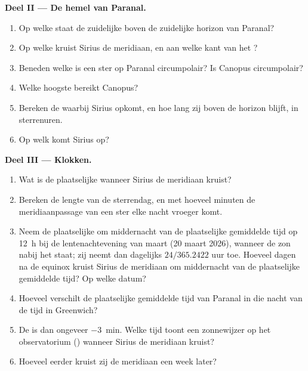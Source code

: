 \begin{problem}
\medskip
\noindent\textbf{Deel II --- De hemel van Paranal.}
\begin{enumerate}[resume]
  \item Op welke  staat de zuidelijke  boven de zuidelijke
        horizon van Paranal?
  \item Op welke  kruist Sirius de meridiaan, en aan welke kant van het
        ?
  \item Beneden welke  is een ster op Paranal circumpolair? Is Canopus
        circumpolair?
  \item Welke hoogste  bereikt Canopus?
  \item Bereken de  waarbij Sirius opkomt, en hoe lang zij boven de
        horizon blijft, in sterrenuren.
  \item Op welk  komt Sirius op?
\end{enumerate}

\medskip
\noindent\textbf{Deel III --- Klokken.}
\begin{enumerate}[resume]
  \item Wat is de plaatselijke  wanneer Sirius de meridiaan kruist?
  \item Bereken de lengte van de sterrendag, en met hoeveel minuten de
        meridiaanpassage van een ster elke nacht vroeger komt.
  \item Neem de plaatselijke  om middernacht van de plaatselijke
        gemiddelde tijd op \qty{12}{h} bij de lentenachtevening van maart
        (20 maart 2026), wanneer de zon nabij het  staat; zij neemt
        dan dagelijks $24/365.2422$ uur toe. Hoeveel dagen na de equinox kruist
        Sirius de meridiaan om middernacht van de plaatselijke gemiddelde tijd?
        Op welke datum?
  \item Hoeveel verschilt de plaatselijke gemiddelde tijd van Paranal in die
        nacht van de tijd in Greenwich?
  \item De  is dan ongeveer \qty{-3}{min}. Welke tijd toont een
        zonnewijzer op het observatorium () wanneer Sirius de
        meridiaan kruist?
  \item Hoeveel eerder kruist zij de meridiaan een week later?
\end{enumerate}


\end{problem}
